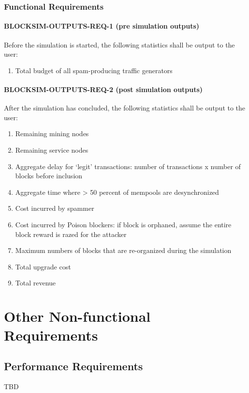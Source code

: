 \documentclass{scrreprt}
\begin{document}
\subsection{Functional Requirements}


\subsubsection{BLOCKSIM-OUTPUTS-REQ-1 (pre simulation outputs)}

Before the simulation is started, the following statistics shall be output
to the user:

\begin{enumerate}
\item Total budget of all spam-producing traffic generators
\end{enumerate}


\subsubsection{BLOCKSIM-OUTPUTS-REQ-2 (post simulation outputs)}

After the simulation has concluded, the following statistics shall be output
to the user:

\begin{enumerate}
\item Remaining mining nodes
\item Remaining service nodes
\item Aggregate delay for `legit' transactions: number of transactions x number of blocks before inclusion
\item Aggregate time where > 50 percent of mempools are desynchronized
\item Cost incurred by spammer
\item Cost incurred by Poison blockers: if block is orphaned, assume the entire block reward is razed for the attacker
\item Maximum numbers of blocks that are re-organized during the simulation
\item Total upgrade cost
\item Total revenue
\end{enumerate}


\chapter{Other Non-functional Requirements}

\section{Performance Requirements}
TBD
\end{document}

